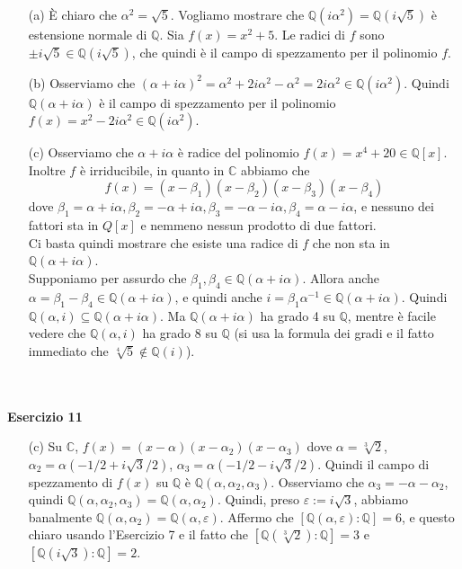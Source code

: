 \documentclass[12pt,a4paper]{report}
\theoremstyle{definition}
\begin{document}
\begin{itemize}
\item[(a)] È chiaro che $\alpha^2=\sqrt{5}$. Vogliamo mostrare che $\mathbb{Q}(i\alpha^2)=\mathbb{Q}(i\sqrt{5})$ è estensione normale di $\mathbb{Q}$. Sia $f(x)=x^2+5$. Le radici di $f$ sono $\pm i\sqrt{5} \in \mathbb{Q}(i\sqrt{5})$, che quindi è il campo di spezzamento per il polinomio $f$.
\item[(b)] Osserviamo che $(\alpha+i\alpha)^2=\alpha^2+2i\alpha^2-\alpha^2=2i\alpha^2 \in \mathbb{Q}(i\alpha^2)$. Quindi $\mathbb{Q}(\alpha+i\alpha)$ è il campo di spezzamento per il polinomio $f(x)=x^2-2i\alpha^2 \in \mathbb{Q}(i\alpha^2)$.
\item[(c)] Osserviamo che $\alpha+i\alpha$ è radice del polinomio $f(x)=x^4+20 \in \mathbb{Q}[x]$. Inoltre $f$ è irriducibile, in quanto in $\mathbb{C}$ abbiamo che 
$$f(x)=(x-\beta_1)(x-\beta_2)(x-\beta_3)(x-\beta_4)$$
dove $\beta_1=\alpha+i\alpha, \beta_2=-\alpha+i\alpha, \beta_3=-\alpha-i\alpha, \beta_4=\alpha-i\alpha$, e nessuno dei fattori sta in $Q[x]$ e nemmeno nessun prodotto di due fattori.\\
Ci basta quindi mostrare che esiste una radice di $f$ che non sta in $\mathbb{Q}(\alpha+i\alpha)$.\\
Supponiamo per assurdo che $\beta_1, \beta_4 \in \mathbb{Q}(\alpha+i\alpha)$. Allora anche $\alpha=\beta_1-\beta_4 \in \mathbb{Q}(\alpha+i\alpha)$, e quindi anche $i=\beta_1 \alpha^{-1} \in \mathbb{Q}(\alpha+i\alpha)$. Quindi $\mathbb{Q}(\alpha,i) \subseteq \mathbb{Q}(\alpha+i\alpha)$. Ma $\mathbb{Q}(\alpha+i\alpha)$ ha grado 4 su $\mathbb{Q}$, mentre è facile vedere che $\mathbb{Q}(\alpha,i)$ ha grado 8 su $\mathbb{Q}$ (si usa la formula dei gradi e il fatto immediato che $\sqrt[4]{5} \not\in \mathbb{Q}(i)$).
\end{itemize}
\ 
\\
\\
\noindent\textbf{Esercizio 11}\\
\begin{itemize}
\item[(c)] Su $\mathbb{C}$, $f(x)=(x-\alpha)(x-\alpha_2)(x-\alpha_3)$ dove $\alpha=\sqrt[3]{2}$, $\alpha_2=\alpha (-1/2+i\sqrt{3}/2)$, $\alpha_3=\alpha (-1/2-i\sqrt{3}/2)$. Quindi il campo di spezzamento di $f(x)$ su $\mathbb{Q}$ è $\mathbb{Q}(\alpha,\alpha_2,\alpha_3)$. Osserviamo che $\alpha_3=-\alpha-\alpha_2$, quindi $\mathbb{Q}(\alpha,\alpha_2,\alpha_3)=\mathbb{Q}(\alpha,\alpha_2)$. Quindi, preso $\varepsilon:=i\sqrt{3}$, abbiamo banalmente $\mathbb{Q}(\alpha,\alpha_2)=\mathbb{Q}(\alpha,\varepsilon)$. Affermo che $[\mathbb{Q}(\alpha,\varepsilon):\mathbb{Q}]=6$, e questo chiaro usando l'Esercizio 7 e il fatto che $[\mathbb{Q}(\sqrt[3]{2}):\mathbb{Q}]=3$ e $[\mathbb{Q}(i\sqrt{3}):\mathbb{Q}]=2$.
\end{itemize}
\end{document}

